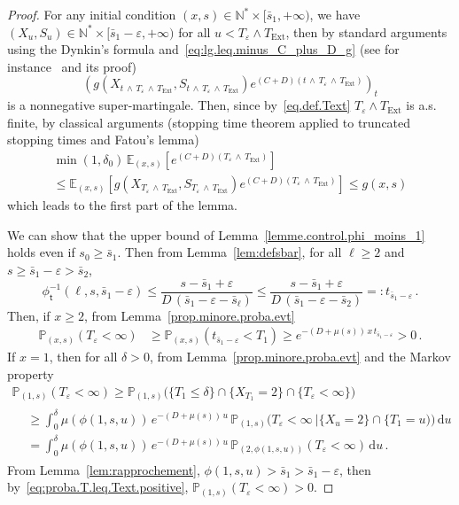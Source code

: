 \documentclass[10pt]{amsart}
\theoremstyle{definition}\newtheorem{defi}[theo]{Definition}\newtheorem{rema}[theo]{Remark}\newtheorem{exam}[theo]{Example}\newtheorem{exem}[theo]{Example}\newtheorem{nota}[theo]{Notation}
\newcommand{\PP}{\mathbb{P}}
\newcommand{\NN}{\mathbb{N}}
\newcommand{\EE}{\mathbb{E}}
\newcommand{\dif}{\mathrm{d}}
\newcommand{\phit}{\phi_\textsf{t}^{-1}}
\newcommand{\Text}{T_{\mathrm{Ext}}}
\newcommand{\1}{\mathbf{1}}
\begin{document}
\begin{proof}
For any initial condition $(x,s) \in \NN^* \times [\bar s_1, +\infty)$, we have $(X_u,S_u)\in \NN^*\times [\bar s_1-\varepsilon,+\infty)$ for all $u<T_\varepsilon\wedge \Text$, then by standard arguments using the Dynkin's formula and~\eqref{eq:lg.leq.minus_C_plus_D_g} (see for instance~\cite[Theorem~2.1]{MTIII} and its proof)
\[
\left(g\left(X_{t\,\wedge\, T_\varepsilon\,\wedge \,\Text},S_{t\,\wedge\,T_\varepsilon\,\wedge\,\Text}\right)e^{(C+D)\left(t\,\wedge \,T_\varepsilon\,\wedge\,\Text\right)}\right)_t
\]
is a nonnegative super-martingale. Then, since by~\eqref{eq.def.Text} $T_\varepsilon\wedge \Text$ is a.s. finite, by classical arguments (stopping time theorem applied to truncated stopping times and Fatou's lemma)
\begin{multline*}
\min(1,\delta_0)\,\EE_{(x,s)}\left[e^{(C+D) (T_\varepsilon\,\wedge\, \Text)} \right] \\
\leq \EE_{(x,s)}\left[g\left(X_{T_\varepsilon\,\wedge\,\Text},S_{T_\varepsilon\,\wedge\,\Text}\right) e^{(C+D) \left(T_\varepsilon\,\wedge\,\Text\right)} \right] \leq g(x,s)
\end{multline*}
which leads to the first part of the lemma.



We can show that the upper bound of Lemma~\ref{lemme.control.phi_moins_1} holds even if $s_0\geq \bar s_1$. Then from Lemma~\ref{lem:defsbar}, for all $\ell \geq 2$ and $s\geq \bar s_1-\varepsilon>\bar s_2$,
\[
\phit(\ell,s,\bar s_1-\varepsilon) \leq \frac{s-\bar s_1+\varepsilon}{D\,(\bar s_1-\varepsilon-\bar s_\ell)}\leq \frac{s-\bar s_1+\varepsilon}{D\,(\bar s_1-\varepsilon-\bar s_2)}=:t_{\bar s_1-\varepsilon}\,.
\]
Then, if $x\geq 2$, from Lemma~\ref{prop.minore.proba.evt}
\begin{align}\label{eq:proba.T.leq.Text.positive}
\PP_{(x,s)}(T_\varepsilon<\infty) &
\geq \PP_{(x,s)}(t_{\bar s_1-\varepsilon}<T_1) \geq e^{-(D+\mu(s))\,x\,t_{\bar s_1-\varepsilon}}>0\,.
\end{align}
If $x=1$, then for all $\delta>0$, from Lemma~\ref{prop.minore.proba.evt} and the Markov property
\begin{multline*}
\PP_{(1,s)}(T_\varepsilon<\infty)  \geq \PP_{(1,s)}\big(\{T_1\leq \delta\} \cap \{X_{T_1}=2\} \cap \{T_\varepsilon<\infty\}\big)
\\
\begin{aligned}
&\geq \int_0^{\delta}
\mu\left(\phi(1,s,u)\right)\, e^{-(D+\mu(s))\,u}\,
\PP_{(1,s)}
\Big(T_\varepsilon<\infty \ \Big| \{X_u=2\}\cap\{T_1=u) \Big)\,\dif u
\\
&= \int_0^{\delta}
\mu\left(\phi(1,s,u)\right)\, e^{-(D+\mu(s))\,u}\,
\PP_{(2,\phi(1,s,u))} (T_\varepsilon<\infty)\,\dif u\,.
\end{aligned}
\end{multline*}
From Lemma~\ref{lem:rapprochement}, $\phi(1,s,u)>\bar s_1>\bar s_1-\varepsilon$, then by~\eqref{eq:proba.T.leq.Text.positive}, $\PP_{(1,s)}(T_\varepsilon<\infty) >0$.
\end{proof}
\end{document}
